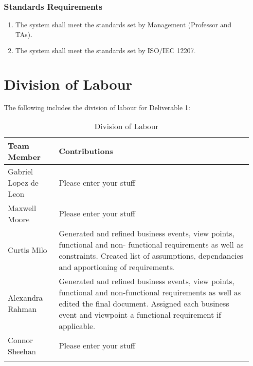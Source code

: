 \documentclass[titlepage]{article}
\begin{document}
		\subsubsection{Standards Requirements}
		\label{ssub:standards_requirements}
		\begin{enumerate}[{LR}1. ]
			\item
			The system shall meet the standards set by Management (Professor and TAs).
			\item
			The system shall meet the standards set by ISO/IEC 12207.
		\end{enumerate}
		
		
		
		\clearpage{}
		\appendix
		\section{Division of Labour}
		\label{sec:division_of_labour}
		The following includes the division of labour for Deliverable 1:

		\begin{longtable}{| p{} | p{} |}
		\hline
		\textbf {Team Member} & \textbf{Contributions}\\ 
		\hline
		Gabriel Lopez de Leon & Please enter your stuff\\
		\hline
		Maxwell Moore & Please enter your stuff\\
		\hline
		Curtis Milo & Generated and refined business events, view points, functional and non- functional requirements as well as constraints. Created list of assumptions, dependancies and apportioning of requirements. \\ 
		\hline
		Alexandra Rahman & Generated and refined business events, view points, functional and non-functional requirements as well as edited the final document. Assigned each business event and viewpoint a functional requirement if applicable.\\
		\hline
		Connor Sheehan & Please enter your stuff\\
		\hline
		
		\caption{Division of Labour}
		\end{longtable}
		
		
		
		
		
		
		\iffalse
		\newpage
\end{document}
